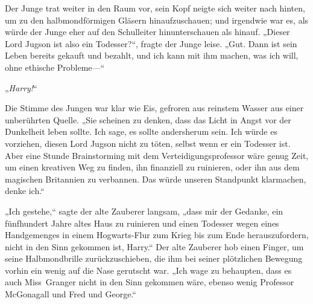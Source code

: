 Der Junge trat weiter in den Raum vor, sein Kopf neigte sich weiter nach hinten, um zu den halbmondförmigen Gläsern hinaufzuschauen; und irgendwie war es, als würde der Junge eher auf den Schulleiter hinunterschauen als hinauf. „Dieser Lord Jugson ist also ein Todesser?“, fragte der Junge leise. „Gut. Dann ist sein Leben bereits gekauft und bezahlt, und ich kann mit ihm machen, was ich will, ohne ethische Probleme—“

„\emph{Harry!}“

Die Stimme des Jungen war klar wie Eis, gefroren aus reinstem Wasser aus einer unberührten Quelle. „Sie scheinen zu denken, dass das Licht in Angst vor der Dunkelheit leben sollte. Ich sage, es sollte andersherum sein. Ich würde es vorziehen, diesen Lord Jugson nicht zu töten, selbst wenn er ein Todesser ist. Aber eine Stunde Brainstorming mit dem Verteidigungsprofessor wäre genug Zeit, um einen kreativen Weg zu finden, ihn finanziell zu ruinieren, oder ihn aus dem magischen Britannien zu verbannen. Das würde unseren Standpunkt klarmachen, denke ich.“

„Ich gestehe,“ sagte der alte Zauberer langsam, „dass mir der Gedanke, ein fünfhundert Jahre altes Haus zu ruinieren und einen Todesser wegen eines Handgemenges in einem Hogwarts-Flur zum Krieg bis zum Ende herauszufordern, nicht in den Sinn gekommen ist, Harry.“ Der alte Zauberer hob einen Finger, um seine Halbmondbrille zurückzuschieben, die ihm bei seiner plötzlichen Bewegung vorhin ein wenig auf die Nase gerutscht war. „Ich wage zu behaupten, dass es auch Miss~Granger nicht in den Sinn gekommen wäre, ebenso wenig Professor McGonagall und Fred und George.“

